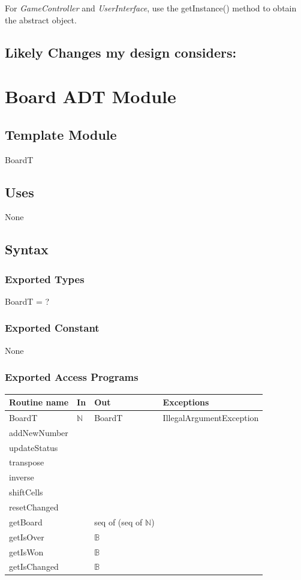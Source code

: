 \documentclass[12pt]{article}
\begin{document}
For \textit{GameController} and \textit{UserInterface}, use the getInstance() method to obtain the abstract object.


\subsection*{Likely Changes my design considers:}

\newpage

\section* {Board ADT Module}

\subsection*{Template Module}

BoardT

\subsection* {Uses}
None
\subsection* {Syntax}
\subsubsection* {Exported Types}
BoardT = ?
\subsubsection* {Exported Constant}
None
\subsubsection* {Exported Access Programs}

\begin{tabular}{| l | l | l | l |}
\hline
\textbf{Routine name} & \textbf{In} & \textbf{Out} & \textbf{Exceptions}\\
\hline
BoardT & $\mathbb{N}$ & BoardT & IllegalArgumentException\\
\hline
addNewNumber &  &  & \\
\hline
updateStatus &  &  & \\
\hline
transpose &  &  & \\
\hline
inverse &  &  & \\
\hline
shiftCells &  &  & \\
\hline
resetChanged  &  &  & \\
\hline
getBoard  &  & seq of (seq of $\mathbb{N}$) & \\
\hline
getIsOver  &  & $\mathbb{B}$ & \\
\hline
getIsWon  &  & $\mathbb{B}$ & \\
\hline
getIsChanged   &  & $\mathbb{B}$ & \\
\hline
\end{tabular}
\end{document}
